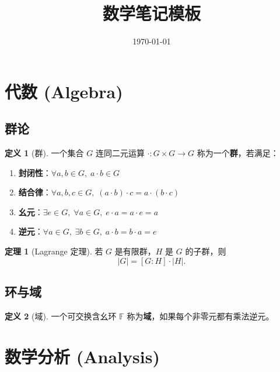 \documentclass[12pt,a4paper]{article}
\title{\textbf{数学笔记模板}}
\author{}
\date{\today}
\theoremstyle{definition}
\newtheorem{definition}{定义}[section]
\newtheorem{theorem}{定理}[section]
\newcommand{\F}{\mathbb{F}}              %
\begin{document}
\maketitle
\tableofcontents
\newpage

\section{代数 (Algebra)}

\subsection{群论}
\begin{definition}[群]
  一个集合 $G$ 连同二元运算 $\cdot: G \times G \to G$ 称为一个\textbf{群}，若满足：
  \begin{enumerate}
    \item \textbf{封闭性}：$\forall a,b \in G,\; a\cdot b \in G$
    \item \textbf{结合律}：$\forall a,b,c \in G,\; (a\cdot b)\cdot c = a\cdot(b\cdot c)$
    \item \textbf{幺元}：$\exists e \in G,\; \forall a\in G,\; e\cdot a = a\cdot e = a$
    \item \textbf{逆元}：$\forall a\in G,\; \exists b\in G,\; a\cdot b = b\cdot a = e$
  \end{enumerate}
\end{definition}

\begin{theorem}[Lagrange 定理]
  若 $G$ 是有限群，$H$ 是 $G$ 的子群，则
  \[
  |G| = [G:H] \cdot |H|.
  \]
\end{theorem}

\subsection{环与域}
\begin{definition}[域]
  一个可交换含幺环 $\F$ 称为\textbf{域}，如果每个非零元都有乘法逆元。
\end{definition}

\section{数学分析 (Analysis)}
\end{document}
